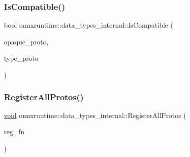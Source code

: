 \mbox{\label{namespaceonnxruntime_1_1data__types__internal_a41fe7f3e42912d2e8db13d576b646120}} 
\subsubsection{\texorpdfstring{Is\+Compatible()}{IsCompatible()}\hspace{0.1cm}{\footnotesize\ttfamily [4/4]}}
{\footnotesize\ttfamily bool onnxruntime\+::data\+\_\+types\+\_\+internal\+::\+Is\+Compatible (\begin{DoxyParamCaption}\item[{const O\+N\+N\+X\+\_\+\+N\+A\+M\+E\+S\+P\+A\+C\+E\+::\+Type\+Proto\+\_\+\+Opaque \&}]{opaque\+\_\+proto,  }\item[{const O\+N\+N\+X\+\_\+\+N\+A\+M\+E\+S\+P\+A\+C\+E\+::\+Type\+Proto\+\_\+\+Opaque \&}]{type\+\_\+proto }\end{DoxyParamCaption})}

\mbox{\label{namespaceonnxruntime_1_1data__types__internal_ada1f3666a57810888a98209550c1cc4b}} 
\subsubsection{\texorpdfstring{Register\+All\+Protos()}{RegisterAllProtos()}}
{\footnotesize\ttfamily \mbox{\hyperlink{mlasi_8h_a88f941d423cb2a819b70a1358982b1a6}{void}} onnxruntime\+::data\+\_\+types\+\_\+internal\+::\+Register\+All\+Protos (\begin{DoxyParamCaption}\item[{const std\+::function$<$ \mbox{\hyperlink{mlasi_8h_a88f941d423cb2a819b70a1358982b1a6}{void}}(\mbox{\hyperlink{namespaceonnxruntime_ad77d0a6e838ec7da5dc35fed5ee66b49}{M\+L\+Data\+Type}})$>$ \&}]{reg\+\_\+fn }\end{DoxyParamCaption})}

